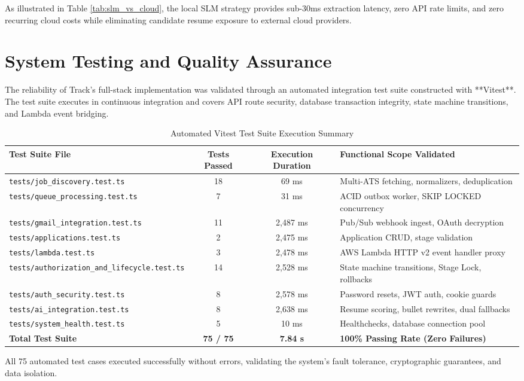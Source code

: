As illustrated in Table \ref{tab:slm_vs_cloud}, the local SLM strategy provides sub-30ms extraction latency, zero API rate limits, and zero recurring cloud costs while eliminating candidate resume exposure to external cloud providers.

\section{System Testing and Quality Assurance}
The reliability of Track's full-stack implementation was validated through an automated integration test suite constructed with **Vitest**. The test suite executes in continuous integration and covers API route security, database transaction integrity, state machine transitions, and Lambda event bridging.

\begin{table}[htbp]
\centering
\small
\caption{Automated Vitest Test Suite Execution Summary}
\label{tab:test_summary}
\begin{tabularx}{\textwidth}{l c c X}
\toprule
\textbf{Test Suite File} & \textbf{Tests Passed} & \textbf{Execution Duration} & \textbf{Functional Scope Validated} \\
\midrule
\texttt{tests/job\_discovery.test.ts} & 18 & 69 ms & Multi-ATS fetching, normalizers, deduplication \\
\texttt{tests/queue\_processing.test.ts} & 7 & 31 ms & ACID outbox worker, SKIP LOCKED concurrency \\
\texttt{tests/gmail\_integration.test.ts} & 11 & 2,487 ms & Pub/Sub webhook ingest, OAuth decryption \\
\texttt{tests/applications.test.ts} & 2 & 2,475 ms & Application CRUD, stage validation \\
\texttt{tests/lambda.test.ts} & 3 & 2,478 ms & AWS Lambda HTTP v2 event handler proxy \\
\texttt{tests/authorization\_and\_lifecycle.test.ts} & 14 & 2,528 ms & State machine transitions, Stage Lock, rollbacks \\
\texttt{tests/auth\_security.test.ts} & 8 & 2,578 ms & Password resets, JWT auth, cookie guards \\
\texttt{tests/ai\_integration.test.ts} & 8 & 2,638 ms & Resume scoring, bullet rewrites, dual fallbacks \\
\texttt{tests/system\_health.test.ts} & 5 & 10 ms & Healthchecks, database connection pool \\
\midrule
\textbf{Total Test Suite} & \textbf{75 / 75} & \textbf{7.84 s} & \textbf{100\% Passing Rate (Zero Failures)} \\
\bottomrule
\end{tabularx}
\end{table}

All 75 automated test cases executed successfully without errors, validating the system's fault tolerance, cryptographic guarantees, and data isolation.

